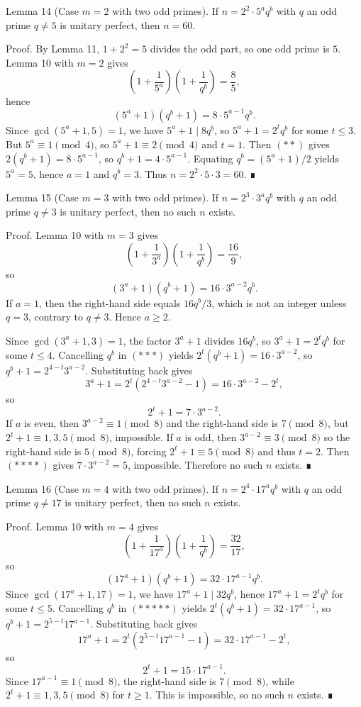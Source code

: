 Lemma 14 (Case $m=2$ with two odd primes).
If $n=2^2\cdot 5^a q^b$ with $q$ an odd prime $q\ne 5$ is unitary perfect, then $n=60$.

Proof.
By Lemma 11, $1+2^2=5$ divides the odd part, so one odd prime is $5$.
Lemma 10 with $m=2$ gives
\[
\left(1+\frac{1}{5^a}\right)\left(1+\frac{1}{q^b}\right)=\frac{8}{5},
\]
hence
\[
(5^a+1)(q^b+1)=8\cdot 5^{a-1} q^b. \tag{**}
\]
Since $\gcd(5^a+1,5)=1$, we have $5^a+1\mid 8q^b$, so
$5^a+1=2^t q^b$ for some $t\le 3$. But $5^a\equiv 1\pmod{4}$, so
$5^a+1\equiv 2\pmod{4}$ and $t=1$. Then $(**)$ gives
$2(q^b+1)=8\cdot 5^{a-1}$, so $q^b+1=4\cdot 5^{a-1}$.
Equating $q^b=(5^a+1)/2$ yields $5^a=5$, hence $a=1$ and $q^b=3$.
Thus $n=2^2\cdot 5\cdot 3=60$. ∎

Lemma 15 (Case $m=3$ with two odd primes).
If $n=2^3\cdot 3^a q^b$ with $q$ an odd prime $q\ne 3$ is unitary perfect, then no such $n$ exists.

Proof.
Lemma 10 with $m=3$ gives
\[
\left(1+\frac{1}{3^a}\right)\left(1+\frac{1}{q^b}\right)=\frac{16}{9},
\]
so
\[
(3^a+1)(q^b+1)=16\cdot 3^{a-2} q^b. \tag{***}
\]
If $a=1$, then the right-hand side equals $16q^b/3$, which is not an integer unless $q=3$,
contrary to $q\ne 3$. Hence $a\ge 2$.

Since $\gcd(3^a+1,3)=1$, the factor $3^a+1$ divides $16q^b$, so
$3^a+1=2^t q^b$ for some $t\le 4$. Cancelling $q^b$ in $(***)$ yields
$2^t(q^b+1)=16\cdot 3^{a-2}$, so $q^b+1=2^{4-t}3^{a-2}$.
Substituting back gives
\[
3^a+1=2^t(2^{4-t}3^{a-2}-1)=16\cdot 3^{a-2}-2^t,
\]
so
\[
2^t+1=7\cdot 3^{a-2}. \tag{****}
\]
If $a$ is even, then $3^{a-2}\equiv 1\pmod{8}$ and the right-hand side is $7\pmod{8}$,
but $2^t+1\equiv 1,3,5\pmod{8}$, impossible. If $a$ is odd, then $3^{a-2}\equiv 3\pmod{8}$
so the right-hand side is $5\pmod{8}$, forcing $2^t+1\equiv 5\pmod{8}$ and thus $t=2$.
Then $(****)$ gives $7\cdot 3^{a-2}=5$, impossible. Therefore no such $n$ exists. ∎

Lemma 16 (Case $m=4$ with two odd primes).
If $n=2^4\cdot 17^a q^b$ with $q$ an odd prime $q\ne 17$ is unitary perfect, then no such $n$ exists.

Proof.
Lemma 10 with $m=4$ gives
\[
\left(1+\frac{1}{17^a}\right)\left(1+\frac{1}{q^b}\right)=\frac{32}{17},
\]
so
\[
(17^a+1)(q^b+1)=32\cdot 17^{a-1} q^b. \tag{*****}
\]
Since $\gcd(17^a+1,17)=1$, we have $17^a+1\mid 32 q^b$, hence
$17^a+1=2^t q^b$ for some $t\le 5$. Cancelling $q^b$ in $(*****)$ yields
$2^t(q^b+1)=32\cdot 17^{a-1}$, so $q^b+1=2^{5-t}17^{a-1}$.
Substituting back gives
\[
17^a+1=2^t(2^{5-t}17^{a-1}-1)=32\cdot 17^{a-1}-2^t,
\]
so
\[
2^t+1=15\cdot 17^{a-1}. \tag{******}
\]
Since $17^{a-1}\equiv 1\pmod{8}$, the right-hand side is $7\pmod{8}$, while
$2^t+1\equiv 1,3,5\pmod{8}$ for $t\ge 1$. This is impossible, so no such $n$ exists. ∎

